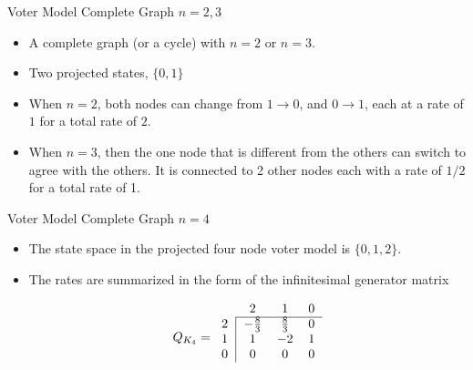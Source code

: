 \documentclass{beamer}
\theoremstyle{definition}
\begin{document}
\begin{frame}{Voter Model Complete Graph $n = 2,3$}
    \begin{itemize}
        \item A complete graph (or a cycle) with $n = 2$ or $n = 3$.
        \item Two projected states, $\{0,1\}$
        \item When $n = 2$, both nodes can change from $1 \to 0$, and $0 \to 1$, each at a rate of $1$ for a total rate of $2$.
        \item When $n = 3$, then the one node that is different from the others can switch to agree with the others. It is connected to 2 other nodes each with a rate of $1/2$ for a total rate of 1.
    \end{itemize}
\end{frame}

\begin{frame}{Voter Model Complete Graph $n = 4$}
\begin{itemize}
    \item The state space in the projected four node voter model is $\{0,1,2\}$.
    \item The rates are summarized in the form of the infinitesimal generator matrix

$$
Q_{K_4} = \begin{blockarray}{cccc}
    & 2 & 1 & 0\\
    \begin{block}{c|ccc}
        \cline{2-4}
        2 & -\frac{8}{3} & \frac{8}{3} & 0 \\
        1 & 1 & -2 & 1\\
        0 & 0 & 0 & 0\\
    \end{block}
\end{blockarray}
$$
\end{itemize}
\end{frame}
\end{document}
